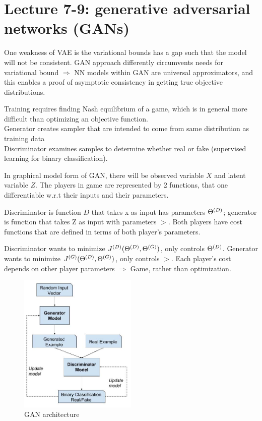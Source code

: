 \documentclass[12pt,a4paper]{article}
\begin{document}
\section{Lecture 7-9: generative adversarial networks (GANs)}

One weakness of VAE is the variational bounds has a gap such that the model will not be consistent. GAN approach differently circumvents needs for variational bound $\Rightarrow$ NN models within GAN are universal approximators, and this enables a proof of asymptotic consistency in getting true objective distributions.

Training requires finding Nash equilibrium of a game, which is in general more difficult than optimizing an objective function. \\
Generator creates sampler that are intended to come from same distribution as training data\\ 
Discriminator examines samples to determine whether real or fake (supervised learning for binary classification).

In graphical model form of GAN, there will be observed variable $X$ and latent variable $Z$. The players in game are represented by 2 functions, that one differentiable w.r.t their inputs and their parameters. 

Discriminator is function $D$ that takes x as input has parameters ${\Theta^{(D)}}$; generator is function that takes Z as input with parameters $\gt$. 
Both players have cost functions that are defined in terms of both player's parameters. 

Discriminator wants to minimize $J^{(D)}({\Theta^{(D)}},{\Theta^{(G)}})$, only controls ${\Theta^{(D)}}$. Generator wants to minimize $J^{(G)}({\Theta^{(D)}},{\Theta^{(G)}})$, only controls $\gt$. 
Each player's cost depends on other player parameters $\Rightarrow$ Game, rather than optimization. 

\begin{figure}[!ht]
    \centering
    \includegraphics[width=0.5\textwidth]{fig/gan_arch.jpg}
    \caption{GAN architecture}
\end{figure}
\end{document}
